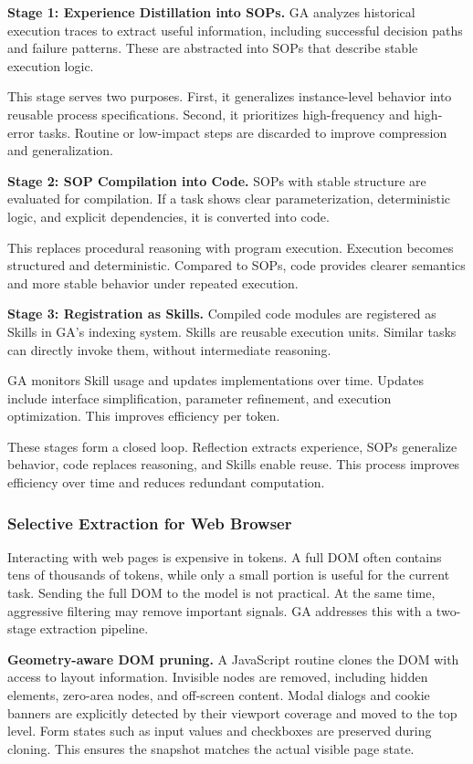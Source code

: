 \textbf{Stage 1: Experience Distillation into SOPs.} GA analyzes historical execution traces to extract useful information, including successful decision paths and failure patterns. These are abstracted into SOPs that describe stable execution logic.

This stage serves two purposes. First, it generalizes instance-level behavior into reusable process specifications. Second, it prioritizes high-frequency and high-error tasks. Routine or low-impact steps are discarded to improve compression and generalization.

\textbf{Stage 2: SOP Compilation into Code.} SOPs with stable structure are evaluated for compilation. If a task shows clear parameterization, deterministic logic, and explicit dependencies, it is converted into code.

This replaces procedural reasoning with program execution. Execution becomes structured and deterministic. Compared to SOPs, code provides clearer semantics and more stable behavior under repeated execution.

\textbf{Stage 3: Registration as Skills.} Compiled code modules are registered as Skills in GA’s indexing system. Skills are reusable execution units. Similar tasks can directly invoke them, without intermediate reasoning.

GA monitors Skill usage and updates implementations over time. Updates include interface simplification, parameter refinement, and execution optimization. This improves efficiency per token.

These stages form a closed loop. Reflection extracts experience, SOPs generalize behavior, code replaces reasoning, and Skills enable reuse. This process improves efficiency over time and reduces redundant computation. 

\subsubsection{Selective Extraction for Web Browser}
\label{sec:structured_extraction}
Interacting with web pages is expensive in tokens. A full DOM often contains tens of thousands of tokens, while only a small portion is useful for the current task. Sending the full DOM to the model is not practical. At the same time, aggressive filtering may remove important signals. GA addresses this with a two-stage extraction pipeline.

\textbf{Geometry-aware DOM pruning.} A JavaScript routine clones the DOM with access to layout information. Invisible nodes are removed, including hidden elements, zero-area nodes, and off-screen content. Modal dialogs and cookie banners are explicitly detected by their viewport coverage and moved to the top level. Form states such as input values and checkboxes are preserved during cloning. This ensures the snapshot matches the actual visible page state.

